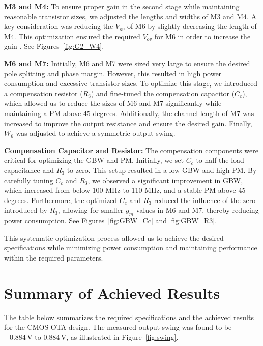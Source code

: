 \documentclass[12pt,a4paper]{article}
\begin{document}
\textbf{M3 and M4:}  
To ensure proper gain in the second stage while maintaining reasonable transistor sizes, we adjusted the lengths and widths of M3 and M4. A key consideration was reducing the $V_{ov}$ of M6 by slightly decreasing the length of M4. This optimization ensured the required $V_{ov}$ for M6 in order to increase the gain . See Figures~\ref{fig:G2_W4}.

\textbf{M6 and M7:}  
Initially, M6 and M7 were sized very large to ensure the desired pole splitting and phase margin. However, this resulted in high power consumption and excessive transistor sizes. To optimize this stage, we introduced a compensation resistor ($R_3$) and fine-tuned the compensation capacitor ($C_c$), which allowed us to reduce the sizes of M6 and M7 significantly while maintaining a PM above 45 degrees. Additionally, the channel length of M7 was increased to improve the output resistance and ensure the desired gain. Finally, $W_6$ was adjusted to achieve a symmetric output swing.

\textbf{Compensation Capacitor and Resistor:}  
The compensation components were critical for optimizing the GBW and PM. Initially, we set $C_c$ to half the load capacitance and $R_3$ to zero. This setup resulted in a low GBW and high PM. By carefully tuning $C_c$ and $R_3$, we observed a significant improvement in GBW, which increased from below 100 MHz to 110 MHz, and a stable PM above 45 degrees. Furthermore, the optimized $C_c$ and $R_3$ reduced the influence of the zero introduced by $R_3$, allowing for smaller $g_m$ values in M6 and M7, thereby reducing power consumption. See Figures~\ref{fig:GBW_Cc} and \ref{fig:GBW_R3}.

This systematic optimization process allowed us to achieve the desired specifications while minimizing power consumption and maintaining performance within the required parameters.

\section*{Summary of Achieved Results}

The table below summarizes the required specifications and the achieved results for the CMOS OTA design. The measured output swing was found to be \( -0.884 \, \text{V} \) to \( 0.884 \, \text{V} \), as illustrated in Figure~\ref{fig:swing}. 
\end{document}
